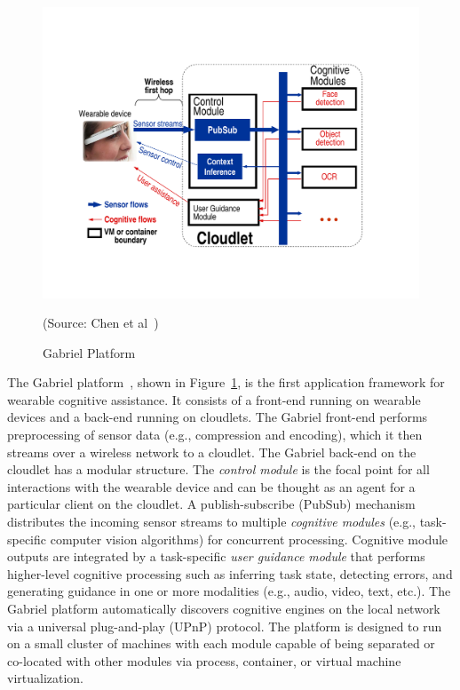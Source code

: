 \begin{figure}
    \centering
    \includegraphics[width=0.8\linewidth]{FIGS/fig-backend-structure-simple-crop.pdf}
    \begin{captiontext}
        {\rm (Source: Chen et al~\cite{chen2017empirical})}
    \end{captiontext}
    \caption{Gabriel Platform}
    \label{fig:gabriel}
\end{figure}

The Gabriel platform~\cite{ha2014towards,chen2017empirical}, shown in
Figure~\ref{fig:gabriel}, is the first application framework for wearable
cognitive assistance. It consists of a front-end running on wearable devices and
a back-end running on cloudlets. The Gabriel front-end performs preprocessing of
sensor data (e.g., compression and encoding), which it then streams over a
wireless network to a cloudlet.  The Gabriel back-end on the cloudlet has a
modular structure. The {\em control module} is the focal point for all
interactions with the wearable device and can be thought as an agent for a
particular client on the cloudlet. A publish-subscribe (PubSub) mechanism
distributes the incoming sensor streams to multiple {\em cognitive modules}
(e.g., task-specific computer vision algorithms) for concurrent processing.
Cognitive module outputs are integrated by a task-specific {\em user guidance
module} that performs higher-level cognitive processing such as inferring task
state, detecting errors, and generating guidance in one or more modalities
(e.g., audio, video, text, etc.). The Gabriel platform automatically discovers
cognitive engines on the local network via a universal plug-and-play (UPnP)
protocol. The platform is designed to run on a small cluster of machines with
each module capable of being separated or co-located with other modules via
process, container, or virtual machine virtualization.

